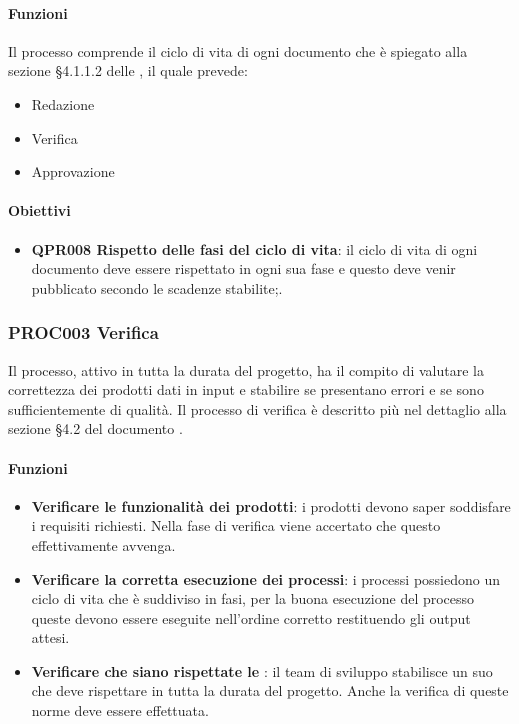 		\paragraph*{Funzioni}
		Il processo comprende il ciclo di vita di ogni documento che è spiegato alla sezione §4.1.1.2 delle \NdP, il quale prevede:
		
		\begin{itemize}
			\item Redazione
			\item Verifica
			\item Approvazione
		\end{itemize}
	
		\paragraph*{Obiettivi}
		
		\begin{itemize}
			\item \textbf{QPR008 Rispetto delle fasi del ciclo di vita}: il ciclo di vita di ogni documento deve essere rispettato in ogni sua fase e questo deve venir pubblicato secondo le scadenze stabilite;.
		\end{itemize}
	
	\subsubsection{PROC003 Verifica}
	Il processo, attivo in tutta la durata del progetto, ha il compito di valutare la correttezza dei prodotti dati in input e stabilire se presentano errori e se sono sufficientemente di qualità. Il processo di verifica è descritto più nel dettaglio alla sezione §4.2 del documento \NdPv.
	
		\paragraph*{Funzioni}
		
		\begin{itemize}
			\item \textbf{Verificare le funzionalità dei prodotti}: i prodotti devono saper soddisfare i requisiti richiesti. Nella fase di verifica viene accertato che questo effettivamente avvenga.
			\item \textbf{Verificare la corretta esecuzione dei processi}: i processi possiedono un ciclo di vita che è suddiviso in fasi, per la buona esecuzione del processo queste devono essere eseguite nell'ordine corretto restituendo gli output attesi.
			\item \textbf{Verificare che siano rispettate le \NdP}: il team di sviluppo stabilisce un suo  che deve rispettare in tutta la durata del progetto. Anche la verifica di queste norme deve essere effettuata.
		\end{itemize}
		
